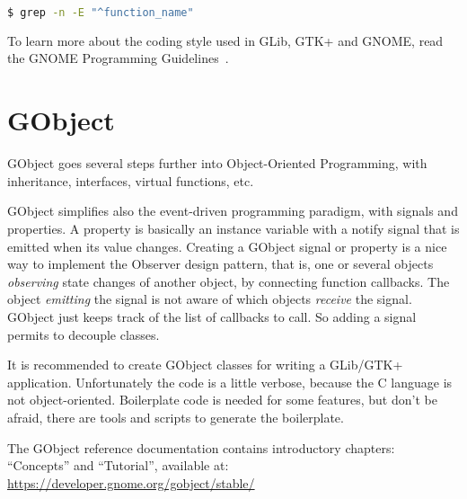 \begin{lstlisting}[language=bash]
$ grep -n -E "^function_name"
\end{lstlisting}

To learn more about the coding style used in GLib, GTK+ and GNOME, read the GNOME Programming Guidelines~\cite{gnome-programming-guidelines}.

\section{GObject}

GObject goes several steps further into Object-Oriented Programming, with inheritance, interfaces, virtual functions, etc.

GObject simplifies also the event-driven programming paradigm, with signals and properties. A property is basically an instance variable with a notify signal that is emitted when its value changes. Creating a GObject signal or property is a nice way to implement the Observer design pattern, that is, one or several objects \emph{observing} state changes of another object, by connecting function callbacks. The object \emph{emitting} the signal is not aware of which objects \emph{receive} the signal. GObject just keeps track of the list of callbacks to call. So adding a signal permits to decouple classes.

It is recommended to create GObject classes for writing a GLib/GTK+ application. Unfortunately the code is a little verbose, because the C language is not object-oriented. Boilerplate code is needed for some features, but don't be afraid, there are tools and scripts to generate the boilerplate.

The GObject reference documentation contains introductory chapters: ``Concepts'' and ``Tutorial'', available at:\\
\url{https://developer.gnome.org/gobject/stable/}
